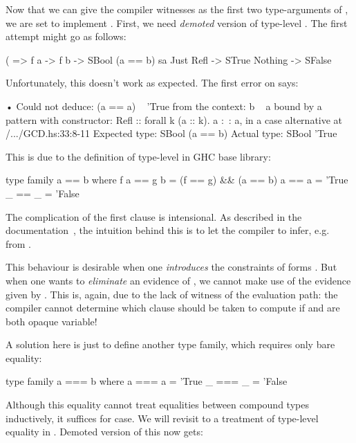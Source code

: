 \documentclass[demotion-paper.tex]{subfiles}
\begin{document}
Now that we can give the compiler witnesses as the first two type-arguments of , we are set to implement .
First, we need \emph{demoted} version of type-level \hask{(==)}.
The first attempt might go as follows:
\begin{code}
(%
      => f a -> f b -> SBool (a == b)
sa %
  Just Refl -> STrue
  Nothing -> SFalse
\end{code}
Unfortunately, this doesn't work as expected.
The first error on  says:

\begin{repl}
• Could not deduce: (a == a) ~ 'True
  from the context: b ~ a
    bound by a pattern with constructor:
               Refl :: forall k (a :: k). a :~: a,
             in a case alternative
    at /.../GCD.hs:33:8-11
  Expected type: SBool (a == b)
    Actual type: SBool 'True
\end{repl}

This is due to the definition of type-level \hask{(==)} in GHC base library:

\begin{code}
type family a == b where
  f a == g b = (f == g) && (a == b)
  a   == a   = 'True
  _   == _   = 'False
\end{code}

The complication of the first clause is intensional.
As described in the documentation~\cite{GHC-Team:2021aa}, the intuition behind this is to let the compiler to infer, e.g.\  from .

This behaviour is desirable when one \emph{introduces} the constraints of forms .
But when one wants to \emph{eliminate} an evidence of , we cannot make use of the evidence given by .
This is, again, due to the lack of witness of the evaluation path: the compiler cannot determine which clause should be taken to compute  if  and  are both opaque variable!

A solution here is just to define another type family, which requires only bare equality:
\begin{code}
type family a === b where
  a === a = 'True
  _ === _ = 'False
\end{code}

Although this equality cannot treat equalities between compound types inductively, it suffices for  case.
We will revisit to a treatment of type-level equality in .
Demoted version of this now gets:
\end{document}
